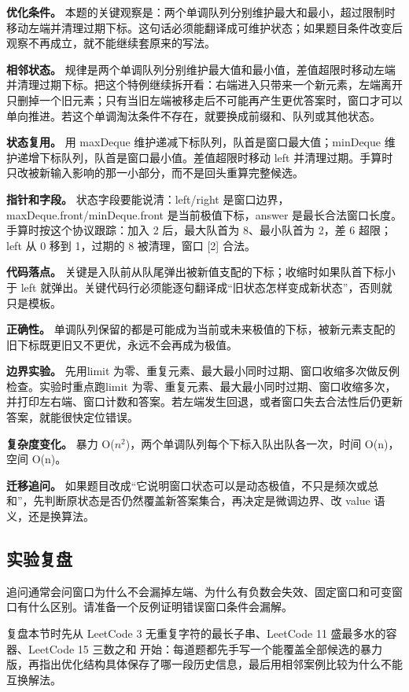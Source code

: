 \textbf{优化条件。} 本题的关键观察是：两个单调队列分别维护最大和最小，超过限制时移动左端并清理过期下标。这句话必须能翻译成可维护状态；如果题目条件改变后观察不再成立，就不能继续套原来的写法。

\textbf{相邻状态。} 规律是两个单调队列分别维护最大值和最小值，差值超限时移动左端并清理过期下标。把这个特例继续拆开看：右端进入只带来一个新元素，左端离开只删掉一个旧元素；只有当旧左端被移走后不可能再产生更优答案时，窗口才可以单向推进。若这个单调淘汰条件不存在，就要换成前缀和、队列或其他状态。

\textbf{状态复用。} 用 maxDeque 维护递减下标队列，队首是窗口最大值；minDeque 维护递增下标队列，队首是窗口最小值。差值超限时移动 left 并清理过期。手算时只改被新输入影响的那一小部分，而不是回头重算完整候选。

\textbf{指针和字段。} 状态字段要能说清：left/right 是窗口边界，maxDeque.front/minDeque.front 是当前极值下标，answer 是最长合法窗口长度。手算时按这个协议跟踪：加入 2 后，最大队首为 8、最小队首为 2，差 6 超限；left 从 0 移到 1，过期的 8 被清理，窗口 [2] 合法。

\textbf{代码落点。} 关键是入队前从队尾弹出被新值支配的下标；收缩时如果队首下标小于 left 就弹出。关键代码行必须能逐句翻译成“旧状态怎样变成新状态”，否则就只是模板。

\textbf{正确性。} 单调队列保留的都是可能成为当前或未来极值的下标，被新元素支配的旧下标既更旧又不更优，永远不会再成为极值。

\textbf{边界实验。} 先用limit 为零、重复元素、最大最小同时过期、窗口收缩多次做反例检查。实验时重点跑limit 为零、重复元素、最大最小同时过期、窗口收缩多次，并打印左右端、窗口计数和答案。若左端发生回退，或者窗口失去合法性后仍更新答案，就能很快定位错误。

\textbf{复杂度变化。} 暴力 O(\ensuremath{n^{2}})，两个单调队列每个下标入队出队各一次，时间 O(n)，空间 O(n)。

\textbf{迁移追问。} 如果题目改成“它说明窗口状态可以是动态极值，不只是频次或总和”，先判断原状态是否仍然覆盖新答案集合，再决定是微调边界、改 value 语义，还是换算法。

\subsection{实验复盘}

追问通常会问窗口为什么不会漏掉左端、为什么有负数会失效、固定窗口和可变窗口有什么区别。请准备一个反例证明错误窗口条件会漏解。

复盘本节时先从 LeetCode 3 无重复字符的最长子串、LeetCode 11 盛最多水的容器、LeetCode 15 三数之和 开始：每道题都先手写一个能覆盖全部候选的暴力版，再指出优化结构具体保存了哪一段历史信息，最后用相邻案例比较为什么不能互换解法。
